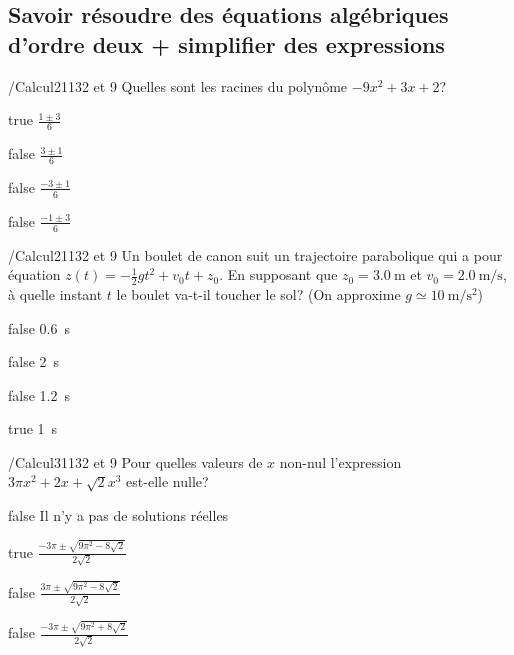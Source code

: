 \documentclass[11pt]{article}
\begin{document}
        \subsection{Savoir résoudre des équations algébriques d'ordre deux + simplifier des expressions}

            \begin{question}{/}{Calcul}{2}{1132 et 9}
                Quelles sont les racines du polynôme $-9x^2+3x+2$?
            \end{question}

            \begin{reponses}
                \item[true] $\frac{1\pm 3}{6}$
                \item[false] $\frac{3 \pm 1}{6}$
                \item[false] $\frac{-3 \pm 1}{6}$
                \item[false] $\frac{-1 \pm 3}{6}$
            \end{reponses}

            \begin{question}{/}{Calcul}{2}{1132 et 9}
                Un boulet de canon suit un trajectoire parabolique qui a pour équation $z(t)=-\frac{1}{2}gt^2+v_0t+z_0$. En supposant que $z_0 = \SI{3.0}{\meter}$ et $v_0 = \SI{2.0}{\meter\per\second}$, à quelle instant $t$ le boulet va-t-il toucher le sol? (On approxime $g\simeq\SI{10}{\meter\per\second\squared}$)
            \end{question}

            \begin{reponses}
                \item[false] \SI{0.6}{\second}
                \item[false] \SI{2}{\second}
                \item[false] \SI{1.2}{\second}
                \item[true] \SI{1}{\second}
            \end{reponses}
        
        	\begin{question}{/}{Calcul}{3}{1132 et 9}
				Pour quelles valeurs de $x$ non-nul l'expression $3\pi x^2 + 2x + \sqrt{2}x^3$ est-elle nulle?
            \end{question}

            \begin{reponses}
            	\item[false] Il n'y a pas de solutions réelles
            	\item[true] $\frac{-3\pi \pm \sqrt{9\pi^2-8\sqrt{2}}}{2\sqrt{2}}$
                \item[false] $\frac{3\pi \pm \sqrt{9\pi^2-8\sqrt{2}}}{2\sqrt{2}}$
                \item[false] $\frac{-3\pi \pm \sqrt{9\pi^2+8\sqrt{2}}}{2\sqrt{2}}$
            \end{reponses}
\end{document}
